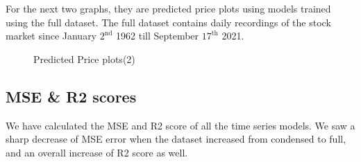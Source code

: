 \documentclass{article}
\begin{document}
For the next two graphs, they are predicted price plots using models trained using the full dataset. The full dataset contains daily recordings of the stock market since January $2^{\text{nd}}$ 1962 till September $17^{\text{th}}$ 2021.

\begin{figure}[H]
    \qquad
    \caption{Predicted Price plots(2)}
    \label{fig:example}
\end{figure}

\subsection{MSE \& R2 scores}
We have calculated the MSE and R2 score of all the time series models. We saw a sharp decrease of MSE error when the dataset increased from condensed to full, and an overall increase of R2 score as well. 
\end{document}
